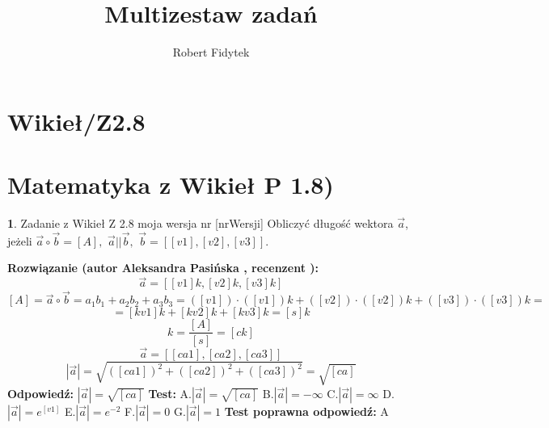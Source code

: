 \documentclass[12pt, a4paper]{article}
\title{Multizestaw zadań}
\author{Robert Fidytek}
\date{}
\theoremstyle{definition} %
\newtheorem{zad}{}
\newcommand{\kategoria}[1]{\section{#1}} %
\newcommand{\zadStart}[1]{\begin{zad}#1\newline} %
\newcommand{\zadStop}{\end{zad}}   %
\newcommand{\rozwStart}[2]{\noindent \textbf{Rozwiązanie (autor #1 , recenzent #2): }\newline} %
\newcommand{\rozwStop}{\newline}                                            %
\newcommand{\odpStart}{\noindent \textbf{Odpowiedź:}\newline}    %
\newcommand{\odpStop}{\newline}                                             %
\newcommand{\testStart}{\noindent \textbf{Test:}\newline} %
\newcommand{\testStop}{\newline} %
\newcommand{\kluczStart}{\noindent \textbf{Test poprawna odpowiedź:}\newline} %
\newcommand{\kluczStop}{\newline} %
\begin{document}
\maketitle


\kategoria{Wikieł/Z2.8}
\kategoria{Matematyka z Wikieł P 1.8)}
\zadStart{Zadanie z Wikieł Z 2.8 moja wersja nr [nrWersji]}
Obliczyć długość wektora $\vec a$, jeżeli $\vec a \circ \vec b=[A],$  $\vec a || \vec  b,$  $\vec b=[[v1],[v2],[v3]]$.
\zadStop
\rozwStart{Aleksandra Pasińska}{}
$$\vec a=[[v1]k,[v2]k,[v3]k]$$
$$[A]=\vec a \circ \vec b=a_1b_1+a_2b_2+a_3b_3=([v1])\cdot ([v1])k+([v2])\cdot ([v2])k+([v3])\cdot ([v3])k=$$ 
$$=[kv1]k+[kv2]k+[kv3]k=[s]k$$ 
$$k=\frac{[A]}{[s]}=[ck]$$
$$\vec a=[[ca1],[ca2],[ca3]]$$
$$|\vec a|=\sqrt{([ca1])^2+([ca2])^2+([ca3])^2}=\sqrt{[ca]}$$
\rozwStop
\odpStart
$|\vec a|=\sqrt{[ca]}$
\odpStop
\testStart
A.$|\vec a|=\sqrt{[ca]}$
B.$|\vec a|=-\infty$
C.$|\vec a|=\infty$
D.$|\vec a|=e^{[v1]}$
E.$|\vec a|=e^{-2}$
F.$|\vec a|=0$
G.$|\vec a|=1$
\testStop
\kluczStart
A
\kluczStop
\end{document}
